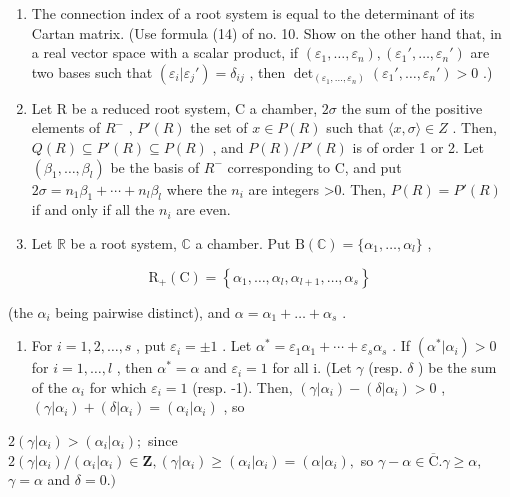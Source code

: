 \begin{enumerate}
\def\labelenumi{\arabic{enumi})}
\setcounter{enumi}{6}
\item
  The connection index of a root system is equal to the determinant of its Cartan matrix. (Use formula (14) of no. 10. Show on the other hand that, in a real vector space with a scalar product, if \((\varepsilon_1, \ldots, \varepsilon_n), (\varepsilon_1', \ldots, \varepsilon_n')\) are two bases such that \((\varepsilon_i | \varepsilon_j') = \delta_{ij}\) , then \(\det_{(\varepsilon_1, \ldots, \varepsilon_n)} (\varepsilon_1', \ldots, \varepsilon_n') > 0\) .)
\item
  Let R be a reduced root system, C a chamber, \(2\sigma\) the sum of the positive elements of \(R^{-}\) , \(P'(R)\) the set of \(x \in P(R)\) such that \(\langle x, \sigma \rangle \in Z\) . Then, \(Q(R) \subseteq P'(R) \subseteq P(R)\) , and \(P(R)/P'(R)\) is of order 1 or 2. Let \((\beta_{1}, \ldots, \beta_{l})\) be the basis of \(R^{-}\) corresponding to C, and put \(2\sigma = n_{1}\beta_{1} + \cdots + n_{l}\beta_{l}\) where the \(n_{i}\) are integers \textgreater0. Then, \(P(R) = P'(R)\) if and only if all the \(n_{i}\) are even.
\item
  Let \(\mathbb{R}\) be a root system, \(\mathbb{C}\) a chamber. Put \(\mathrm{B}(\mathbb{C}) = \{\alpha_1, \ldots, \alpha_l\}\) ,
\end{enumerate}

\[
\mathrm{R} _ {+} (\mathrm{C}) = \left\{\alpha_ {1}, \dots , \alpha_ {l}, \alpha_ {l + 1}, \dots , \alpha_ {s} \right\}
\]

(the \(\alpha_{i}\) being pairwise distinct), and \(\alpha = \alpha_{1} + \dots +\alpha_{s}\) .

\begin{enumerate}
\def\labelenumi{\alph{enumi})}
\tightlist
\item
  For \(i = 1, 2, \ldots, s\) , put \(\varepsilon_{i} = \pm 1\) . Let \(\alpha^{*} = \varepsilon_{1}\alpha_{1} + \cdots + \varepsilon_{s}\alpha_{s}\) . If \((\alpha^{*}|\alpha_{i}) > 0\) for \(i = 1, \ldots, l\) , then \(\alpha^{*} = \alpha\) and \(\varepsilon_{i} = 1\) for all i. (Let \(\gamma\) (resp. \(\delta\) ) be the sum of the \(\alpha_{i}\) for which \(\varepsilon_{i} = 1\) (resp. -1). Then, \((\gamma|\alpha_{i}) - (\delta|\alpha_{i}) > 0\) , \((\gamma|\alpha_{i}) + (\delta|\alpha_{i}) = (\alpha_{i}|\alpha_{i})\) , so
\end{enumerate}

\(2(\gamma|\alpha_{i})>(\alpha_{i}|\alpha_{i});\) since \(2(\gamma|\alpha_{i}) / (\alpha_{i}|\alpha_{i})\in \mathbf{Z},(\gamma |\alpha_{i})\geqslant (\alpha_{i}|\alpha_{i}) = (\alpha |\alpha_{i}),\) so \(\gamma -\alpha \in \overline{\mathrm{C}}. \gamma \geqslant \alpha ,\) \(\gamma = \alpha\) and \(\delta = 0.)\)

